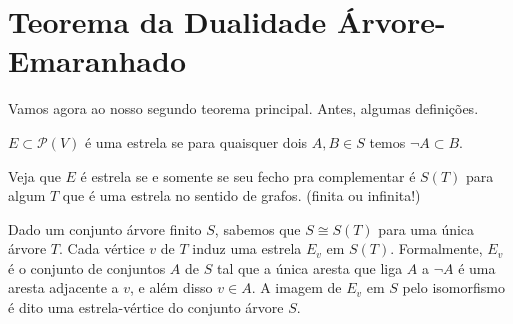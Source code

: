 \section{Teorema da Dualidade Árvore-Emaranhado}

Vamos agora ao nosso segundo teorema principal. Antes, algumas definições.

\begin{definicao*}
  $E \subset \mathcal{P}(V)$ é uma estrela se para quaisquer dois $A,B \in S$ temos $\lnot A \subset B$.

  Veja que $E$ é estrela se e somente se seu fecho pra complementar é $S(T)$ para algum $T$ que é uma estrela no sentido de grafos. (finita ou infinita!)

  Dado um conjunto árvore finito $S$, sabemos que $S \cong S(T)$ para uma única árvore $T$. Cada vértice $v$ de $T$ induz uma estrela $E_v$ em $S(T)$. Formalmente, $E_v$ é o conjunto de conjuntos $A$ de $S$ tal que a única aresta que liga $A$ a $\lnot A$ é uma aresta adjacente a $v$, e além disso $v \in A$. A imagem de $E_v$ em $S$ pelo isomorfismo é dito uma estrela-vértice do conjunto árvore $S$.
\end{definicao*}

